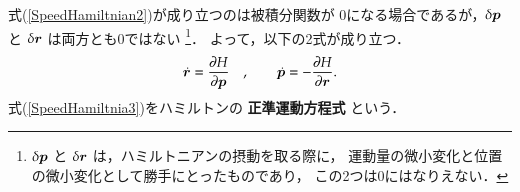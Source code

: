                 式(\ref{SpeedHamiltnian2})が成り立つのは被積分関数が
                0になる場合であるが，$\delta \boldsymbol{p}$ と $\delta \boldsymbol{r}$ は両方とも0ではない
                    \footnote{
                        $\delta \boldsymbol{p}$ と $\delta \boldsymbol{r}$ は，ハミルトニアンの摂動を取る際に，
                        運動量の微小変化と位置の微小変化として勝手にとったものであり，
                        この2つは0にはなりえない．
                    }．
                よって，以下の2式が成り立つ．
                    \begin{align}\label{SpeedHamiltnia3}
                        \dot{\br} = \frac{\rd H}{\rd \bp} \quad, \qquad
                        \dot{\bp} = - \frac{\rd H}{\rd \br}.
                    \end{align}
                式(\ref{SpeedHamiltnia3})をハミルトンの \textbf{正準運動方程式} という．

